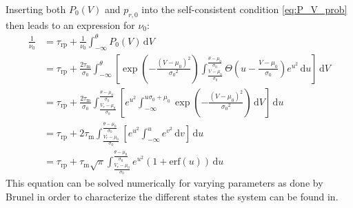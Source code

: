Inserting both $P_0(V)$ and $p_{r, 0}$ into the self-consistent condition \eqref{eq:P_V_prob}
then leads to an expression for $\nu_0$:
\begin{equation}
    \begin{split}
        \frac{1}{\nu_0} 	
            &= \tau_\text{rp} + \frac{1}{\nu_0} \int_{-\infty}^{\theta} \! P_0(V) \, \text{d}V  \\ 
            &= \tau_\text{rp} + \frac{2 \tau_\text{m}}{\sigma_0} 
                \int_{-\infty}^{\theta} \! \left[ 
                    \exp{\left(- \frac{(V - \mu_0)^2}{{\sigma_0}^2} \right)}
                    \int_{\frac{V - \mu_0}{\sigma_0}}^{\frac{\theta - \mu_0}{\sigma_0}} \! 
                        \Theta \left(u - \frac{V - \mu_0}{\sigma_0} \right) e^{u^2} \, \text{d}u 
                    \right] \, \text{d}V  \\ 
            &= \tau_\text{rp} + \frac{2 \tau_\text{m}}{\sigma_0} 
                \int_{\frac{V_r - \mu_0}{\sigma_0}}^{\frac{\theta - \mu_0}{\sigma_0}} \! 
                    \left[ 
                        e^{u^2}
                        \int_{-\infty}^{u \sigma_0 + \mu_0} \! 
                        \exp{\left(- \frac{(V - \mu_0)^2}{{\sigma_0}^2} \right)}
                        \, \text{d}V
                    \right] \, \text{d}u  \\ 
            &= \tau_\text{rp} + 2 \tau_\text{m}
                \int_{\frac{V_r - \mu_0}{\sigma_0}}^{\frac{\theta - \mu_0}{\sigma_0}} \! 
                    \left[ 
                        e^{u^2}
                        \int_{-\infty}^{u} \! e^{v^2} \, \text{d}v
                    \right] \, \text{d}u  \\ 
            &= \tau_\text{rp} + \tau_\text{m} \sqrt{\pi}
                \int_{\frac{V_r - \mu_0}{\sigma_0}}^{\frac{\theta - \mu_0}{\sigma_0}} \! 
                e^{u^2} \left(1 + \text{erf}(u)\right)
                \, \text{d}u  
        \label{eq:self_consistency}
    \end{split}
\end{equation}
This equation can be solved numerically for varying parameters as done by Brunel in order to 
characterize the different states the system can be found in. 

